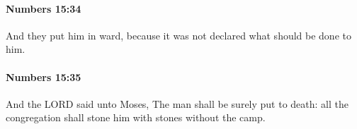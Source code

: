 		\paragraph{Numbers 15:34} %
			\label{NUMBERS-15-34}

			And they put him in ward, because it was not declared what should be done to him.


		\paragraph{Numbers 15:35} %
			\label{NUMBERS-15-35}

			And the LORD said unto Moses, The man shall be surely put to death: all the congregation shall stone him with stones without the camp.



